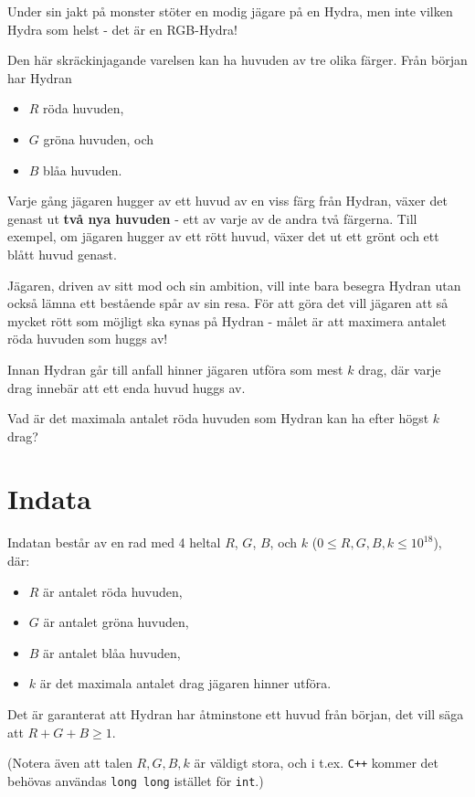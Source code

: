 \noindent
Under sin jakt på monster stöter en modig jägare på en Hydra,
men inte vilken Hydra som helst - det är en RGB-Hydra!

Den här skräckinjagande varelsen kan ha huvuden av tre olika färger. Från början har Hydran
\begin{itemize}
\item $R$ röda huvuden,
\item $G$ gröna huvuden, och
\item $B$ blåa huvuden.
\end{itemize}

Varje gång jägaren hugger av ett huvud av en viss färg från Hydran, växer det genast ut \textbf{två nya huvuden}
- ett av varje av de andra två färgerna. Till exempel, om jägaren hugger av ett rött huvud, växer det ut ett grönt
och ett blått huvud genast.

Jägaren, driven av sitt mod och sin ambition, vill inte bara besegra Hydran utan också lämna ett bestående
spår av sin resa. För att göra det vill jägaren att så mycket rött som möjligt ska synas på Hydran - målet
är att maximera antalet röda huvuden som huggs av!

Innan Hydran går till anfall hinner jägaren utföra som mest $k$ drag, där varje drag innebär att ett enda
huvud huggs av.

Vad är det maximala antalet röda huvuden som Hydran kan ha efter högst $k$ drag?

\section*{Indata}
Indatan består av en rad med 4 heltal $R$, $G$, $B$, och $k$ ($0 \leq R, G, B, k \leq 10^{18}$), där:
\begin{itemize}
    \item $R$ är antalet röda huvuden,
    \item $G$ är antalet gröna huvuden,
    \item $B$ är antalet blåa huvuden,
    \item $k$ är det maximala antalet drag jägaren hinner utföra.
\end{itemize}

Det är garanterat att Hydran har åtminstone ett huvud från början, det vill säga att $R + G + B \geq 1$.

(Notera även att talen $R,G,B,k$ är väldigt stora, och i t.ex. \texttt{C++} kommer det behövas användas
\texttt{long long} istället för \texttt{int}.)

